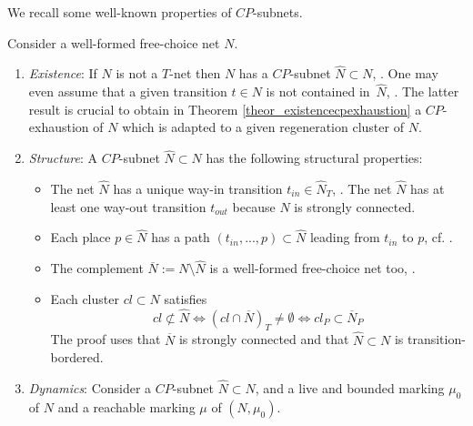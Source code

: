 \documentclass{fundam}
\begin{document}
\begin{flushleft}
We recall some well-known properties of $CP$-subnets.
\end{flushleft}
\begin{remark}\label{rem_existencestructuredynamics}
Consider a well-formed free-choice net $N$.
\begin{enumerate}
\item \emph{Existence}: If $N$ is not a $T$-net then $N$ has a $CP$-subnet $\hat{N} \subset N$, \mbox{\cite[Prop. 7.11]{DE1995}}. One may even assume that a given transition $t\in N$ is not contained \mbox{in $\hat{N}$}, \cite[Lem. 1.2]{Wehler2010}. The latter result is crucial to obtain in Theorem \ref{theor_existencecpexhaustion} a $CP$-exhaustion of $N$ which is adapted to a given regeneration cluster of $N$.

\item \emph{Structure}: A $CP$-subnet $\hat{N} \subset N$ has the following structural properties:

\begin{itemize}
\item The net $\hat{N}$ has a unique way-in transition $t_{in} \in \hat{N}_T$, \mbox{\cite[Prop. 7.10]{DE1995}}. The net $\hat{N}$ has at least one way-out transition $t_{out}$ because $N$ is strongly connected.\vspace*{0.8mm}

\item Each place $p \in \hat{N}$ has a path $(t_{in},...,p) \subset \hat{N}$ leading from $t_{in}$ to $p$, cf. \mbox{\cite[Prop. 7.10 proof]{DE1995}}.\vspace*{0.8mm}

\item The complement $\overline{N}:=N\setminus \hat{N}$ is a well-formed free-choice net too, \cite[Cor. 7.9]{DE1995}.\vspace*{0.8mm}

\item Each cluster $cl \subset N$ satisfies
$$cl \not\subset \hat{N} \iff (cl \cap \overline{N})_T \neq \emptyset \iff cl_P \subset \overline{N}_P$$
The proof uses that $\overline{N}$ is strongly connected and that $\hat{N} \subset N$ is transition-bordered.
\end{itemize}

\item \emph{Dynamics}: Consider a $CP$-subnet $\hat{N} \subset N$, and a live and bounded marking $\mu_0$ of $N$ and a reachable marking $\mu$ of $(N,\mu_0)$.


\end{enumerate}
\end{remark}
\end{document}
